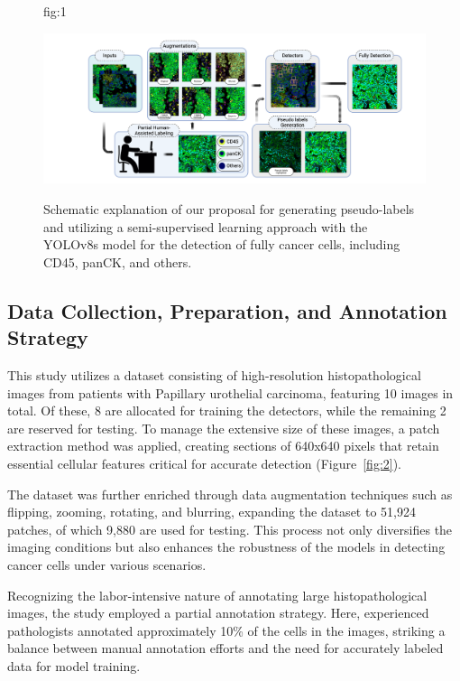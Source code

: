 \documentclass[anon]{midl} %
\begin{document}
\begin{figure}[htbp]
\floatconts
{fig:1}
{\caption{Schematic explanation of our proposal for generating pseudo-labels and utilizing a semi-supervised learning approach with the YOLOv8s model for the detection of fully cancer cells, including CD45, panCK, and others.}}
{\includegraphics[width=1\linewidth]{images/1.png}}
\end{figure}

\subsection{Data Collection, Preparation, and Annotation Strategy}
This study utilizes a dataset consisting of high-resolution histopathological images from patients with Papillary urothelial carcinoma, featuring 10 images in total. Of these, 8 are allocated for training the detectors, while the remaining 2 are reserved for testing. To manage the extensive size of these images, a patch extraction method was applied, creating sections of 640x640 pixels that retain essential cellular features critical for accurate detection (Figure~\ref{fig:2}).

The dataset was further enriched through data augmentation techniques such as flipping, zooming, rotating, and blurring, expanding the dataset to 51,924 patches, of which 9,880 are used for testing. This process not only diversifies the imaging conditions but also enhances the robustness of the models in detecting cancer cells under various scenarios.

Recognizing the labor-intensive nature of annotating large histopathological images, the study employed a partial annotation strategy. Here, experienced pathologists annotated approximately 10\% of the cells in the images, striking a balance between manual annotation efforts and the need for accurately labeled data for model training.
\end{document}
